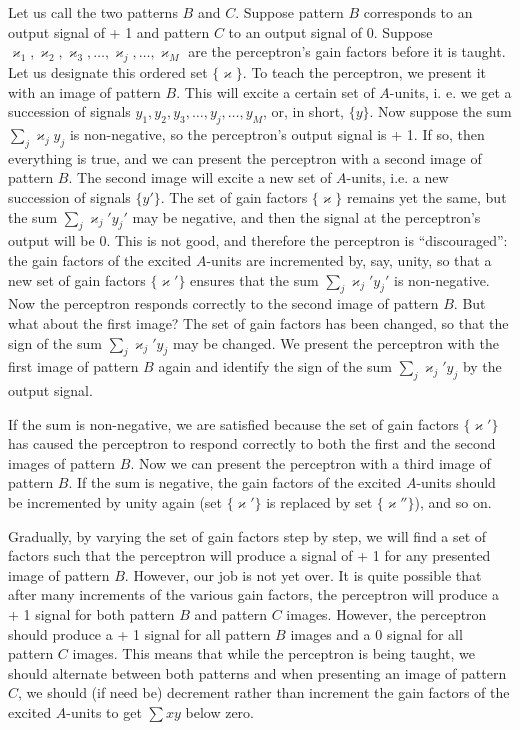 Let us call the two patterns $B$ and $C$. Suppose pattern $B$ corresponds to an output signal of + 1 and pattern $C$ to an output signal of 0. Suppose $\varkappa_{1}, \varkappa_{2}, \varkappa_{3},\ldots{} ,  \varkappa_{j},\ldots{}, \varkappa_{M}$ are the perceptron's gain factors before it is taught. Let us designate this ordered set $\{ \varkappa \}$. To teach the perceptron, we present it with an image of pattern $B$. This will excite a certain set of $A$-units, i. e. we get a succession of signals $y_{1}, y_{2}, y_{3},\ldots{} ,y_{j},\ldots{} , y_{M}$, or, in short, $\{ y \}$. Now suppose the sum $\sum_{j} \varkappa_{j} y_{j} $ is
non-negative, so the perceptron's output signal is + 1. If so, then
everything is true, and we can present the perceptron with a second
image of pattern $B$. The second image will excite a new set of $A$-units,
i.e. a new succession of signals $\{ y' \}$. The set of gain factors $\{ \varkappa \}$ remains yet the same, but the sum $\sum_{j} \varkappa_{j}' y_{j}' $ may be negative, and then the signal at the perceptron's output will be 0. This is not good, and therefore the perceptron is ``discouraged'': the gain factors of the excited $A$-units are incremented by, say, unity, so that a new set of gain factors $\{ \varkappa '\}$ ensures that the sum $\sum_{j} \varkappa_{j}' y_{j}' $ is non-negative. Now the perceptron responds correctly to the second image of pattern $B$. But what about the first image? The set of gain factors has been changed, so that the sign of the sum $\sum_{j} \varkappa_{j}' y_{j} $ may be changed. We present the perceptron with the first image of pattern $B$ again and identify the sign of the sum $\sum_{j} \varkappa_{j}' y_{j} $  by the output signal.

If the sum is non-negative, we are satisfied because the set of gain
factors $\{ \varkappa' \}$ has caused the perceptron to respond correctly to both the first and the second images of pattern $B$. Now we can present the
perceptron with a third image of pattern $B$. If the sum is negative, the
gain factors of the excited $A$-units should be incremented by unity again
(set $\{ \varkappa' \}$ is replaced by set $\{ \varkappa'' \}$), and so on.

Gradually, by varying the set of gain factors step by step, we will find
a set of factors such that the perceptron will produce a signal of + 1 for
any presented image of pattern $B$. However, our job is not yet over. It is
quite possible that after many increments of the various gain factors, the
perceptron will produce a + 1 signal for both pattern $B$ and pattern
$C$ images. However, the perceptron should produce a + 1 signal for all
pattern $B$ images and a 0 signal for all pattern $C$ images. This means
that while the perceptron is being taught, we should alternate between
both patterns and when presenting an image of pattern $C$, we should (if
need be) decrement rather than increment the gain factors of the excited
$A$-units to get $\sum x y$ below zero.

